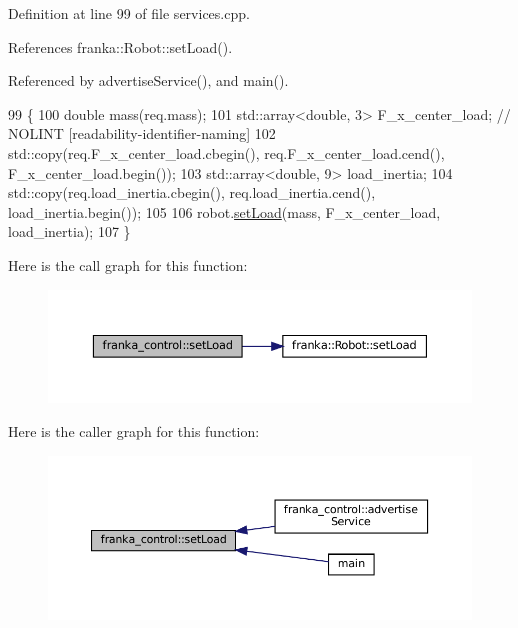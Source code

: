 Definition at line 99 of file services.\+cpp.



References franka\+::\+Robot\+::set\+Load().



Referenced by advertise\+Service(), and main().


\begin{DoxyCode}
99                                                                                 \{
100   \textcolor{keywordtype}{double} mass(req.mass);
101   std::array<double, 3> F\_x\_center\_load;  \textcolor{comment}{// NOLINT [readability-identifier-naming]}
102   std::copy(req.F\_x\_center\_load.cbegin(), req.F\_x\_center\_load.cend(), F\_x\_center\_load.begin());
103   std::array<double, 9> load\_inertia;
104   std::copy(req.load\_inertia.cbegin(), req.load\_inertia.cend(), load\_inertia.begin());
105 
106   robot.\hyperlink{classfranka_1_1Robot_afcb708df10f24563dbcf7d5b907b4a15}{setLoad}(mass, F\_x\_center\_load, load\_inertia);
107 \}
\end{DoxyCode}
Here is the call graph for this function\+:
\nopagebreak
\begin{figure}[H]
\begin{center}
\leavevmode
\includegraphics[width=350pt]{namespacefranka__control_a3fbd42b0a097186b01181eb159ef1785_cgraph}
\end{center}
\end{figure}
Here is the caller graph for this function\+:
\nopagebreak
\begin{figure}[H]
\begin{center}
\leavevmode
\includegraphics[width=350pt]{namespacefranka__control_a3fbd42b0a097186b01181eb159ef1785_icgraph}
\end{center}
\end{figure}
